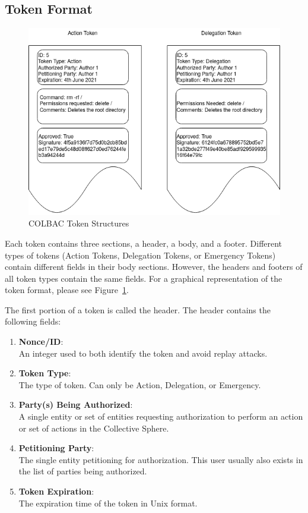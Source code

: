 \subsection{Token Format}
\label{sec:Tokenformat}
\begin{figure}
\includegraphics[width=\linewidth]{figs/TokenStructures.png}
\caption{COLBAC Token Structures}
\label{fig:Tokenformatfigure}
\end{figure}
Each token contains three sections, a header, a body, and a footer. Different
types of tokens (Action Tokens, Delegation Tokens, or Emergency Tokens) contain
different fields in their body sections. However, the headers and footers of all
token types contain the same fields. For a graphical representation of the token
format, please see Figure~\ref{fig:Tokenformatfigure}.

The first portion of a token is called the header. The header contains the
following fields:
\begin{enumerate}
\item \textbf{Nonce/ID}:\\ 
An integer used to both identify the token and avoid replay attacks.
\item \textbf{Token Type}:\\ 
The type of token. Can only be Action, Delegation, or Emergency.
\item \textbf{Party(s) Being Authorized}:\\
A single entity or set of entities requesting authorization to perform an action
or set of actions in the Collective Sphere.
\item \textbf{Petitioning Party}:\\
The single entity petitioning for authorization. This user usually also exists
in the list of parties being authorized.
\item \textbf{Token Expiration}:\\
The expiration time of the token in Unix format.
\end{enumerate}

